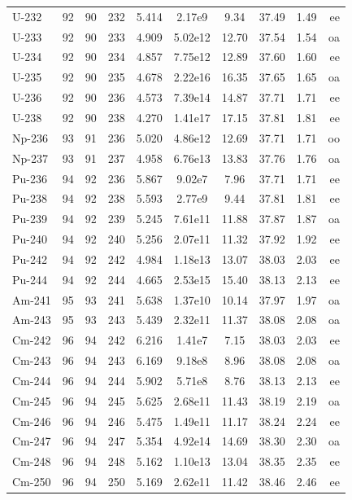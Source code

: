\begin{longtable}{lccccccccr}
U-232 & 92 & 90 & 232 & 5.414 & 2.17e9 & 9.34 & 37.49 & 1.49 & ee \\
U-233 & 92 & 90 & 233 & 4.909 & 5.02e12 & 12.70 & 37.54 & 1.54 & oa \\
U-234 & 92 & 90 & 234 & 4.857 & 7.75e12 & 12.89 & 37.60 & 1.60 & ee \\
U-235 & 92 & 90 & 235 & 4.678 & 2.22e16 & 16.35 & 37.65 & 1.65 & oa \\
U-236 & 92 & 90 & 236 & 4.573 & 7.39e14 & 14.87 & 37.71 & 1.71 & ee \\
U-238 & 92 & 90 & 238 & 4.270 & 1.41e17 & 17.15 & 37.81 & 1.81 & ee \\
Np-236 & 93 & 91 & 236 & 5.020 & 4.86e12 & 12.69 & 37.71 & 1.71 & oo \\
Np-237 & 93 & 91 & 237 & 4.958 & 6.76e13 & 13.83 & 37.76 & 1.76 & oa \\
Pu-236 & 94 & 92 & 236 & 5.867 & 9.02e7 & 7.96 & 37.71 & 1.71 & ee \\
Pu-238 & 94 & 92 & 238 & 5.593 & 2.77e9 & 9.44 & 37.81 & 1.81 & ee \\
Pu-239 & 94 & 92 & 239 & 5.245 & 7.61e11 & 11.88 & 37.87 & 1.87 & oa \\
Pu-240 & 94 & 92 & 240 & 5.256 & 2.07e11 & 11.32 & 37.92 & 1.92 & ee \\
Pu-242 & 94 & 92 & 242 & 4.984 & 1.18e13 & 13.07 & 38.03 & 2.03 & ee \\
Pu-244 & 94 & 92 & 244 & 4.665 & 2.53e15 & 15.40 & 38.13 & 2.13 & ee \\
Am-241 & 95 & 93 & 241 & 5.638 & 1.37e10 & 10.14 & 37.97 & 1.97 & oa \\
Am-243 & 95 & 93 & 243 & 5.439 & 2.32e11 & 11.37 & 38.08 & 2.08 & oa \\
Cm-242 & 96 & 94 & 242 & 6.216 & 1.41e7 & 7.15 & 38.03 & 2.03 & ee \\
Cm-243 & 96 & 94 & 243 & 6.169 & 9.18e8 & 8.96 & 38.08 & 2.08 & oa \\
Cm-244 & 96 & 94 & 244 & 5.902 & 5.71e8 & 8.76 & 38.13 & 2.13 & ee \\
Cm-245 & 96 & 94 & 245 & 5.625 & 2.68e11 & 11.43 & 38.19 & 2.19 & oa \\
Cm-246 & 96 & 94 & 246 & 5.475 & 1.49e11 & 11.17 & 38.24 & 2.24 & ee \\
Cm-247 & 96 & 94 & 247 & 5.354 & 4.92e14 & 14.69 & 38.30 & 2.30 & oa \\
Cm-248 & 96 & 94 & 248 & 5.162 & 1.10e13 & 13.04 & 38.35 & 2.35 & ee \\
Cm-250 & 96 & 94 & 250 & 5.169 & 2.62e11 & 11.42 & 38.46 & 2.46 & ee \\

\end{longtable}

